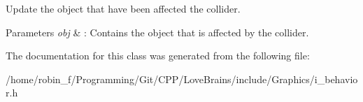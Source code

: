 Update the object that have been affected the collider. 


\begin{DoxyParams}{Parameters}
{\em obj} & \+: Contains the object that is affected by the collider. \\
\hline
\end{DoxyParams}


The documentation for this class was generated from the following file\+:\begin{DoxyCompactItemize}
\item 
/home/robin\+\_\+f/\+Programming/\+Git/\+C\+P\+P/\+Love\+Brains/include/\+Graphics/i\+\_\+behavior.\+h\end{DoxyCompactItemize}
